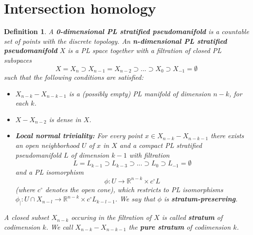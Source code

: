\documentclass{scrreprt}
\newtheorem{definition}[prop]{Definition}
\begin{document}
\section{Intersection homology}

\begin{definition}
A \textbf{0-dimensional PL stratified pseudomanifold} is a countable set of points with the discrete topology. An \textbf{n-dimensional PL stratified pseudomanifold} $X$ is a PL space together with a filtration of closed PL subspaces
\begin{equation*}
X=X_n \supset X_{n-1} = X_{n-2} \supset ... \supset X_0 \supset X_{-1} = \emptyset
\end{equation*}
such that the following conditions are satisfied:
\begin{itemize}
\item $X_{n-k} - X_{n-k-1}$ is a (possibly empty) PL manifold of dimension $n-k$, for each $k$.
\item $X-X_{n-2}$ is dense in $X$.
\item \textbf{Local normal triviality:} For every point $x \in X_{n-k} - X_{n-k-1}$ there exists an open neighborhood $U$ of $x$  in $X$ and a compact PL stratified pseudomanifold $L$ of dimension $k-1$ with filtration
\begin{equation*}
L = L_{k-1} \supset L_{k-3} \supset ... \supset L_0 \supset L_{-1}= \emptyset
\end{equation*}
and a PL isomorphism
\begin{equation*}
\phi : U \to \mathbb{R}^{n-k} \times c^{\circ} L
\end{equation*}
(where $c^{\circ}$ denotes the open cone), which restricts to PL isomorphisms $\phi_| : U \cap X_{n-l} \to \mathbb{R}^{n-k} \times c^{\circ} L_{k-l-1}$. We say that $\phi$ is \textbf{stratum-preserving}.
\end{itemize}
A closed subset $X_{n-k}$ occuring in the filtration of $X$ is called \textbf{stratum} of codimension $k$. We call $X_{n-k}-X_{n-k-1}$ the \textbf{pure stratum} of codimension $k$.
\end{definition}
\end{document}
